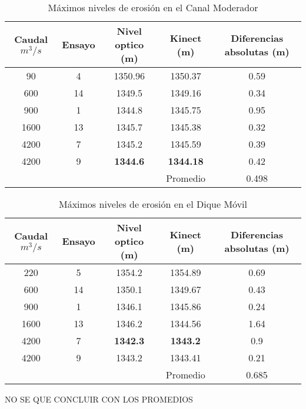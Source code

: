 \begin {table}[H]
\caption {Máximos niveles de erosión en el Canal Moderador} 
\label{tab:erosion-maxima-cm} 
\begin{center}

\begin{tabular}{|c|c|c|c|c|}
\hline 
Caudal  $m^{3}/s$ & Ensayo & Nivel optico (m) & Kinect  (m) & Diferencias absolutas (m) \\ 
\hline 
90 & 4 & 1350.96 & 1350.37 & 0.59 \\ 
\hline 
600 & 14 & 1349.5 & 1349.16 & 0.34 \\ 
\hline 
900 & 1 & 1344.8 & 1345.75 & 0.95 \\ 
\hline 
1600 & 13 & 1345.7 & 1345.38 & 0.32 \\ 
\hline 
4200 & 7 & 1345.2 & 1345.59 & 0.39 \\ 
\hline 
4200 & 9 & \textbf{1344.6} & \textbf{1344.18} & 0.42 \\ 
\hline 
     &   &        & Promedio & 0.498 \\
\hline 
\end{tabular}
\end{center}
\end{table}

\begin {table}[H]
\caption {Máximos niveles de erosión en el Dique Móvil} 
\label{tab:erosion-maxima-dm}
\begin{center}
 
\begin{tabular}{|c|c|c|c|c|}
\hline 
Caudal  $m^{3}/s$ & Ensayo & Nivel optico (m) & Kinect  (m) & Diferencias absolutas (m) \\ 
\hline 
220 & 5 & 1354.2 & 1354.89 & 0.69 \\ 
\hline 
600 & 14 & 1350.1 & 1349.67 & 0.43 \\   
\hline 
900 & 1 & 1346.1 & 1345.86 & 0.24 \\ 
\hline 
1600 & 13 & 1346.2 & 1344.56 & 1.64 \\ 
\hline 
4200 & 7 & \textbf{1342.3} & \textbf{1343.2} & 0.9 \\  
\hline 
4200 & 9 & 1343.2 & 1343.41 & 0.21 \\ 
\hline 
     &   &        & Promedio & 0.685 \\
\hline 
\end{tabular}
\end{center}
\end{table}

NO SE QUE CONCLUIR CON LOS PROMEDIOS

